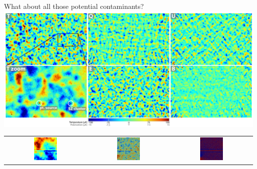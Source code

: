 \documentclass[table]{beamer}
\begin{document}
\begin{frame}{What about all those potential contaminants?}
	\centering
	\includegraphics[width=\textwidth]{actpol_2014_TQUEB.pdf} \\
	\begin{tabular}{ccc}
		\includegraphics[width=0.3\textwidth]{contaminants/12_glitch_teb_0.png} &
		\includegraphics[width=0.3\textwidth]{contaminants/12_glitch_teb_1.png} &
		\includegraphics[width=0.3\textwidth]{contaminants/12_glitch_teb_2.png}
	\end{tabular}
\end{frame}
\end{document}
